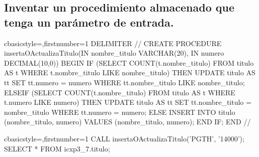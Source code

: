 	\subsection{Inventar un procedimiento almacenado que tenga un parámetro de entrada.}
		\begin{sourcecodep}[]{c}{basicstyle={\fontsize{10}{10}\selectfont\ttfamily},firstnumber=1}{}
			DELIMITER //
			CREATE PROCEDURE insertaOActualizaTitulo(IN nombre_titulo VARCHAR(20), IN numero DECIMAL(10,0))
			BEGIN
				IF (SELECT COUNT(t.nombre_titulo) FROM titulo AS t WHERE t.nombre_titulo LIKE nombre_titulo) THEN
					UPDATE titulo AS tt
						SET tt.numero = numero 
						WHERE tt.nombre_titulo LIKE nombre_titulo;
				ELSEIF (SELECT COUNT(t.nombre_titulo) FROM titulo AS t WHERE t.numero LIKE numero) THEN
					UPDATE titulo AS tt
						SET tt.nombre_titulo = nombre_titulo 
						WHERE tt.numero = numero;
				ELSE
					INSERT INTO titulo (nombre_titulo, numero) 
						VALUES (nombre_titulo, numero);
				END IF;
			END
			//\end{sourcecodep}
		\begin{sourcecodep}[]{c}{basicstyle={\fontsize{10}{10}\selectfont\ttfamily},firstnumber=1}{}
			CALL insertaOActualizaTitulo('PGTH', '14000');
			SELECT * FROM icxp3_7.titulo;\end{sourcecodep}
